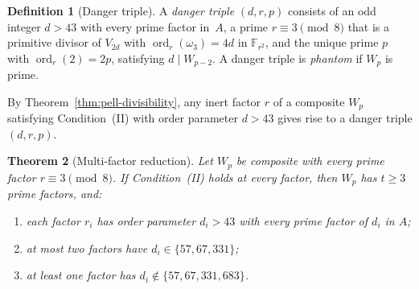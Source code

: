 \documentclass[12pt]{article}
\theoremstyle{plain}
\newtheorem{theorem}{Theorem}[section]
\theoremstyle{definition}
\newtheorem{definition}[theorem]{Definition}
\theoremstyle{remark}
\begin{document}
\begin{definition}[Danger triple]\label{def:danger-triple}
A \emph{danger triple} \((d, r, p)\) consists of an odd integer
\(d > 43\) with every prime factor in~\(A\), a prime
\(r \equiv 3 \pmod{8}\) that is a primitive divisor of \(V_{2d}\)
with \(\operatorname{ord}_r(\omega_3) = 4d\) in
\(\mathbb{F}_{r^2}\), and the unique prime \(p\) with
\(\operatorname{ord}_r(2) = 2p\), satisfying \(d \mid W_{p-2}\).
A danger triple is \emph{phantom} if \(W_p\) is prime.
\end{definition}

By Theorem~\ref{thm:pell-divisibility}, any inert factor \(r\) of
a composite \(W_p\) satisfying Condition~(II) with order parameter
\(d > 43\) gives rise to a danger triple \((d, r, p)\).

\begin{theorem}[Multi-factor reduction]\label{thm:multi-factor}
Let \(W_p\) be composite with every prime factor
\(r \equiv 3 \pmod{8}\). If Condition~(II) holds at every factor,
then \(W_p\) has \(t \geq 3\) prime factors, and:
\begin{enumerate}
\item[\textup{(a)}] each factor \(r_i\) has order parameter
  \(d_i > 43\) with every prime factor of \(d_i\) in \(A\);
\item[\textup{(b)}] at most two factors have
  \(d_i \in \{57, 67, 331\}\);
\item[\textup{(c)}] at least one factor has
  \(d_i \notin \{57, 67, 331, 683\}\).
\end{enumerate}
\end{theorem}
\end{document}
